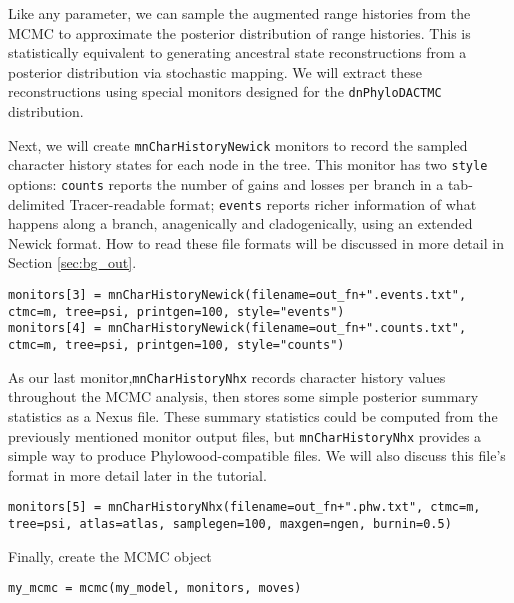 Like any parameter, we can sample the augmented range histories from the MCMC to approximate the posterior distribution of range histories.
This is statistically equivalent to generating ancestral state reconstructions from a posterior distribution via stochastic mapping.
We will extract these reconstructions using special monitors designed for the {\tt dnPhyloDACTMC} distribution.

Next, we will create {\tt mnCharHistoryNewick} monitors to record the sampled character history states for each node in the tree.
This monitor has two {\tt style} options: {\tt counts} reports the number of gains and losses per branch in a tab-delimited Tracer-readable format;  {\tt events} reports richer information of what happens along a branch, anagenically and cladogenically, using an extended Newick format.
How to read these file formats will be discussed in more detail in Section \ref{sec:bg_out}.

\begin{snugshade}
\begin{lstlisting}
monitors[3] = mnCharHistoryNewick(filename=out_fn+".events.txt", ctmc=m, tree=psi, printgen=100, style="events")
monitors[4] = mnCharHistoryNewick(filename=out_fn+".counts.txt", ctmc=m, tree=psi, printgen=100, style="counts")

\end{lstlisting}
\end{snugshade}

As our last monitor,{\tt mnCharHistoryNhx} records character history values throughout the MCMC analysis, then stores some simple posterior summary statistics as a Nexus file.
These summary statistics could be computed from the previously mentioned monitor output files, but {\tt mnCharHistoryNhx} provides a simple way to produce Phylowood-compatible files.
We will also discuss this file's format in more detail later in the tutorial.

\begin{snugshade}
\begin{lstlisting}
monitors[5] = mnCharHistoryNhx(filename=out_fn+".phw.txt", ctmc=m, tree=psi, atlas=atlas, samplegen=100, maxgen=ngen, burnin=0.5)
\end{lstlisting}
\end{snugshade}

Finally, create the MCMC object

\begin{snugshade}
\begin{lstlisting}
my_mcmc = mcmc(my_model, monitors, moves)
\end{lstlisting}
\end{snugshade}

